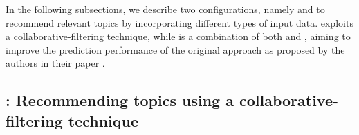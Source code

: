 
In the following subsections, we describe two \TF configurations, namely \TFa 
and \TFb to recommend relevant topics by incorporating different types of input 
data. \TFa exploits a collaborative-filtering technique, while \TFb is a 
combination of both \MNB and \TFa, aiming to improve the prediction performance 
of the original \MNB approach as proposed by the authors in their paper 
\cite{10.1145/3383219.3383227}. %







\subsection{\TFa: Recommending topics using a collaborative-filtering technique} \label{sec:CFRecommendation}



